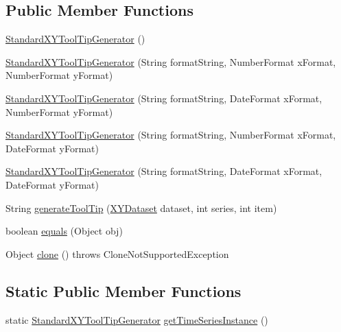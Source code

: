 \subsection*{Public Member Functions}
\begin{DoxyCompactItemize}
\item 
\mbox{\hyperlink{classorg_1_1jfree_1_1chart_1_1labels_1_1_standard_x_y_tool_tip_generator_a6ac1d9f935822678fe51942bcc6c6991}{Standard\+X\+Y\+Tool\+Tip\+Generator}} ()
\item 
\mbox{\hyperlink{classorg_1_1jfree_1_1chart_1_1labels_1_1_standard_x_y_tool_tip_generator_ab903ab0d4bcfa27c9d2f6b565ef3d1a0}{Standard\+X\+Y\+Tool\+Tip\+Generator}} (String format\+String, Number\+Format x\+Format, Number\+Format y\+Format)
\item 
\mbox{\hyperlink{classorg_1_1jfree_1_1chart_1_1labels_1_1_standard_x_y_tool_tip_generator_acc5e97a00679f7a46a0e0de59fa31699}{Standard\+X\+Y\+Tool\+Tip\+Generator}} (String format\+String, Date\+Format x\+Format, Number\+Format y\+Format)
\item 
\mbox{\hyperlink{classorg_1_1jfree_1_1chart_1_1labels_1_1_standard_x_y_tool_tip_generator_a89a502c0280cc5f7dcae3c4f84997dc1}{Standard\+X\+Y\+Tool\+Tip\+Generator}} (String format\+String, Number\+Format x\+Format, Date\+Format y\+Format)
\item 
\mbox{\hyperlink{classorg_1_1jfree_1_1chart_1_1labels_1_1_standard_x_y_tool_tip_generator_a3f0959f531fa9a00d6ab059ec9e02458}{Standard\+X\+Y\+Tool\+Tip\+Generator}} (String format\+String, Date\+Format x\+Format, Date\+Format y\+Format)
\item 
String \mbox{\hyperlink{classorg_1_1jfree_1_1chart_1_1labels_1_1_standard_x_y_tool_tip_generator_ae5dff4e12b23a3534b3765aec33a2347}{generate\+Tool\+Tip}} (\mbox{\hyperlink{interfaceorg_1_1jfree_1_1data_1_1xy_1_1_x_y_dataset}{X\+Y\+Dataset}} dataset, int series, int item)
\item 
boolean \mbox{\hyperlink{classorg_1_1jfree_1_1chart_1_1labels_1_1_standard_x_y_tool_tip_generator_a86205ced9deaf0daf7e8c7b430ab8f63}{equals}} (Object obj)
\item 
Object \mbox{\hyperlink{classorg_1_1jfree_1_1chart_1_1labels_1_1_standard_x_y_tool_tip_generator_a9195b1a1a57b41ffc92e95c36f2611b5}{clone}} ()  throws Clone\+Not\+Supported\+Exception 
\end{DoxyCompactItemize}
\subsection*{Static Public Member Functions}
\begin{DoxyCompactItemize}
\item 
static \mbox{\hyperlink{classorg_1_1jfree_1_1chart_1_1labels_1_1_standard_x_y_tool_tip_generator}{Standard\+X\+Y\+Tool\+Tip\+Generator}} \mbox{\hyperlink{classorg_1_1jfree_1_1chart_1_1labels_1_1_standard_x_y_tool_tip_generator_a0769827e32cb094ee216a480a8a2d3ae}{get\+Time\+Series\+Instance}} ()
\end{DoxyCompactItemize}
